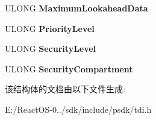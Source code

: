 \begin{DoxyCompactItemize}
\item 
\mbox{\label{struct___t_d_i___e_n_d_p_o_i_n_t___i_n_f_o_a08ffabd60f4e523c78ae26ef4d295b72}} 
U\+L\+O\+NG {\bfseries Maximum\+Lookahead\+Data}
\item 
\mbox{\label{struct___t_d_i___e_n_d_p_o_i_n_t___i_n_f_o_a77bd6a1466e16fc71e1886328d777778}} 
U\+L\+O\+NG {\bfseries Priority\+Level}
\item 
\mbox{\label{struct___t_d_i___e_n_d_p_o_i_n_t___i_n_f_o_a3581aa1f5e5a0fc8ba876ff92a6b7671}} 
U\+L\+O\+NG {\bfseries Security\+Level}
\item 
\mbox{\label{struct___t_d_i___e_n_d_p_o_i_n_t___i_n_f_o_a74a351064210940b5fb243c3bde2da9b}} 
U\+L\+O\+NG {\bfseries Security\+Compartment}
\end{DoxyCompactItemize}


该结构体的文档由以下文件生成\+:\begin{DoxyCompactItemize}
\item 
E\+:/\+React\+O\+S-\/0../sdk/include/psdk/tdi.\+h\end{DoxyCompactItemize}
